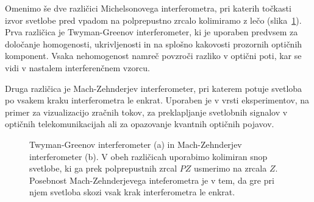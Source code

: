 Omenimo še dve različici Michelsonovega interferometra, pri katerih
točkasti izvor svetlobe pred vpadom na polprepustno zrcalo kolimiramo z lečo 
(slika~\ref{fig:06_TG-MZ}). Prva različica je Twyman-Greenov interferometer, 
ki je uporaben predvsem za 
določanje homogenosti, ukrivljenosti in na splošno kakovosti prozornih 
optičnih komponent. Vsaka nehomogenost namreč povzroči razliko v optični poti,
kar se vidi v nastalem interferenčnem vzorcu. 

Druga različica je Mach-Zehnderjev interferometer, pri 
katerem potuje svetloba po vsakem kraku interferometra le enkrat. Uporaben je v vrsti
eksperimentov, na primer za vizualizacijo zračnih tokov, za preklapljanje 
svetlobnih signalov v optičnih telekomunikacijah ali za opazovanje kvantnih
optičnih pojavov.
\begin{figure}[ht]
\centering
\def\svgwidth{140truemm} 

\caption{Twyman-Greenov interferometer (a) in Mach-Zehnderjev 
interferometer (b). V obeh različicah uporabimo kolimiran
snop svetlobe, ki ga prek polprepustnih zrcal $PZ$ usmerimo na zrcala $Z$. Posebnost
Mach-Zehnderjevega inteferometra je v tem, da gre pri njem svetloba skozi vsak krak
interferometra le enkrat. 
}
\label{fig:06_TG-MZ}
\end{figure}

